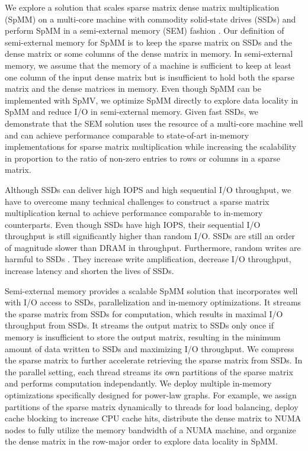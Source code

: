 We explore a solution that scales sparse matrix dense matrix multiplication
(SpMM) on a multi-core machine with commodity solid-state drives (SSDs) and
perform SpMM in a semi-external memory (SEM) fashion \cite{flashgraph,
Abello98}. Our definition of semi-external memory for SpMM is to keep the sparse
matrix on SSDs and the dense matrix or some columns of the dense matrix in
memory. In semi-external memory, we assume
that the memory of a machine is sufficient to keep at least one column
of the input dense matrix but is insufficient to hold both the sparse matrix
and the dense matrices in memory. Even though SpMM can be implemented with SpMV,
we optimize SpMM directly to explore data locality in SpMM and reduce I/O
in semi-external memory. Given fast SSDs, we demonstrate that the SEM solution
uses the resource of a multi-core machine well and
can achieve performance comparable to state-of-art in-memory implementations
for sparse matrix multiplication while increasing the scalability in proportion
to the ratio of non-zero entries to rows or columns in a sparse matrix.


Although SSDs can deliver high IOPS and high sequential I/O throughput, we have
to overcome many technical challenges to construct a sparse matrix
multiplication kernal to achieve performance comparable to in-memory
counterparts. Even though SSDs have high IOPS, their sequential I/O throughput
is still significantly higher than random I/O. SSDs are still an order of
magnitude slower than DRAM in throughput. Furthermore, random writes are harmful
to SSDs \cite{sfs}. They increase write amplification, decrease I/O throughput,
increase latency and shorten the lives of SSDs.

Semi-external memory provides a scalable SpMM solution that incorporates well
with I/O access to SSDs, parallelization and in-memory optimizations.
It streams the sparse matrix from SSDs for computation, which results in maximal
I/O throughput from SSDs. It streams the output matrix to SSDs only once if
memory is insufficient to store the output matrix, resulting in
the minimum amount of data written to SSDs and maximizing I/O throughput.
We compress the sparse matrix to further accelerate retrieving the sparse
matrix from SSDs. In the parallel setting, each thread streams its own partitions
of the sparse matrix and performs computation independantly.
We deploy multiple in-memory optimizations specifically designed for power-law
graphs. For example, we assign partitions of the sparse matrix dynamically to
threads for load balancing, deploy cache blocking to increase CPU cache hits,
distribute the dense matrix to NUMA nodes to fully utilize the memory
bandwidth of a NUMA machine, and organize the dense matrix in the row-major order
to explore data locality in SpMM.

